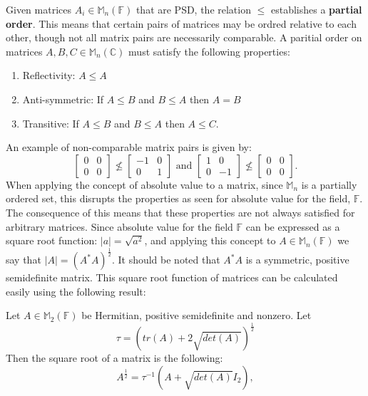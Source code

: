 \begin{definition}
    Given matrices $A_i\in\mathbb{M}_n({\mathbb{F}})$ that are PSD, the relation \(\leq\) establishes a \textbf{partial order}. This means that certain pairs of matrices may be ordred relative to each other, though not all matrix pairs are necessarily comparable. A paritial order on matrices \(A, B, C \in \mathbb{M}_n({\mathbb{C}})\) must satisfy the following properties:
    \begin{enumerate}
        \item Reflectivity: $A \leq A$
        \item Anti-symmetric: If $ A \leq B$ and $B\leq A$ then $A=B$
        \item Transitive: If $A\leq B$ and $B \leq A$ then $A\leq C$.
    \end{enumerate}
\end{definition}
An example of non-comparable matrix pairs is given by:
$$
\begin{bmatrix}
    0 & 0\\
    0 & 0
\end{bmatrix}
\nleq
\begin{bmatrix}
    -1 & 0 \\
     0 & 1
\end{bmatrix} \text{ and }
\begin{bmatrix}
    1 & 0 \\
     0 & -1
\end{bmatrix}
\nleq
\begin{bmatrix}
    0 & 0\\
    0 & 0
\end{bmatrix}.$$
When applying the concept of absolute value to a matrix, since $\mathbb{M}_n$ is a partially ordered set, this disrupts the properties as seen for absolute value for the field, $\mathbb{F}$. 
The consequence of this means that these properties are not always satisfied for arbitrary matrices.
Since absolute value for the field \( \mathbb{F} \) can be expressed as a square root function: $|a| = \sqrt{a^2}$, and applying this concept to $A \in \mathbb{M}_n(\mathbb{F})$ we say that $|A| = \left( A^*A\right)^\frac{1}{2}.$ 
It should be noted that $A^*A$ is a symmetric, positive semidefinite matrix. This square root function of matrices can be calculated easily using the following result: 
\begin{theorem}
    \label{theorem1}
    Let $A \in \mathbb{M}_2(\mathbb{F})$ be Hermitian, positive semidefinite and nonzero. Let 
        $$
        \tau = \left( tr(A) + 2\sqrt{det(A)} \right)^{\frac{1}{2}}
        $$
            Then the square root of a matrix is the following:
        $$
        A^\frac{1}{2} =\tau^{-1}(A + \sqrt{det(A)}I_2),
        $$
\end{theorem}
